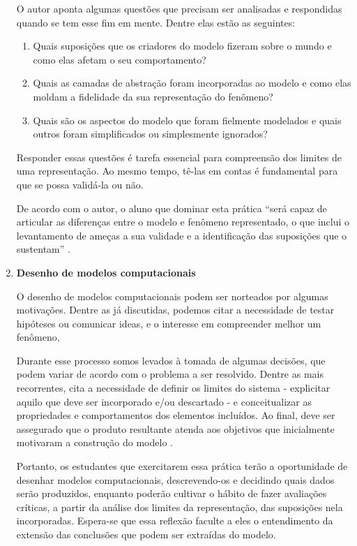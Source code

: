 \begin{enumerate}
  O autor aponta algumas questões que precisam ser analisadas e respondidas quando se tem esse fim em mente. Dentre elas estão as seguintes:

  \begin{enumerate}
    \item Quais suposições que os criadores do modelo fizeram sobre o mundo e como elas afetam o seu comportamento?
    \item Quais as camadas de abstração foram incorporadas ao modelo e como elas moldam a fidelidade da sua representação do fenômeno?
    \item Quais são os aspectos do modelo que foram fielmente modelados e quais outros foram simplificados ou simplesmente ignorados?
  \end{enumerate}

  Responder essas questões é tarefa essencial para compreensão dos limites de uma representação. Ao mesmo tempo, tê-las em contas é fundamental para que se possa validá-la ou não.

  De acordo com o autor, o aluno que dominar esta prática ``será capaz de articular as diferenças entre o modelo e fenômeno representado, o que inclui o levantamento de ameças a sua validade e a identificação das suposições que o sustentam'' \cite{Weintrop2016}.

  \item \textbf{Desenho de modelos computacionais}

  O desenho de modelos computacionais podem ser norteados por algumas motivações. Dentre as já discutidas, podemos citar a necessidade de testar hipóteses ou comunicar ideas, e o interesse em compreender melhor um fenômeno, 

  Durante esse processo somos levados à tomada de algumas decisões, que podem variar de acordo com o problema a ser resolvido. Dentre as mais recorrentes,  cita a necessidade de definir os limites do sistema - explicitar aquilo que deve ser incorporado e/ou descartado - e conceitualizar as propriedades e comportamentos dos elementos incluídos. Ao final, deve ser assegurado que o produto resultante atenda aos objetivos que inicialmente motivaram a construção do modelo \cite{Weintrop2016}.

  Portanto, os estudantes que exercitarem essa prática terão a oportunidade de desenhar modelos computacionais, descrevendo-os e decidindo quais dados serão produzidos, enquanto poderão cultivar o hábito de fazer avaliações críticas, a partir da análise dos limites da representação, das suposições nela incorporadas. Espera-se que essa reflexão faculte a eles o entendimento da extensão das conclusões que podem ser extraídas do modelo.


\end{enumerate}
